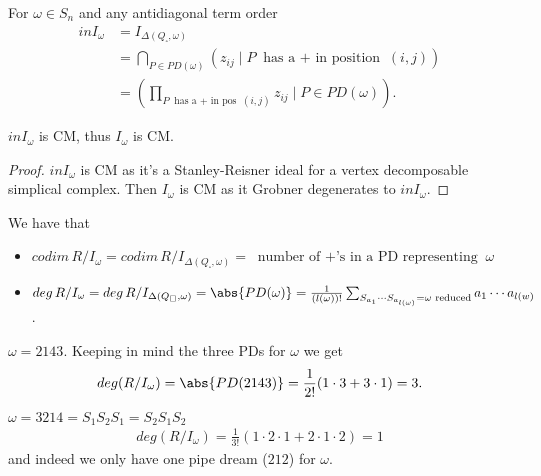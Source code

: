 \begin{theorem}
    For $\omega \in S_n$ and any antidiagonal term order
    \begin{align*}
        in I_\omega &= I_{\Delta (Q_\square, \omega)}\\
        &= \bigcap_{P \in PD(\omega)} ( z_{ij} \mid P \text{ has a $+$ in position } (i,j) )\\
        &= ( \prod_{P \text{ has a $+$ in pos } (i,j)} z_{ij} \mid P \in PD(\omega) ).
    \end{align*}
\end{theorem}

\begin{corollary}
    $in I_\omega $ is CM, thus $I_\omega$ is CM.
\end{corollary}

\begin{proof}
    $in  I_\omega$ is CM as it's a Stanley-Reisner ideal for a vertex decomposable simplical complex. Then $I_\omega$ is CM as it Grobner degenerates to $in I_\omega$.
\end{proof}

\begin{corollary}
    We have that
    \begin{itemize}
        \item $codim\, R/ I_\omega = codim\, R/ I_{\Delta (Q_\square, \omega )} = \text{ number of $+$'s in a PD representing } \omega$
        \item $deg \,R / I_\omega  = deg \, R/ I_{\Delta (Q_\square , \omega) } = \abs{ PD(\omega)} = \frac{1}{(l(\omega ))!} \sum_{S_{a_{1}} \cdots S_{a_{l(\omega)} } = \omega \text{ reduced} } a_1 \cdots a_{l(w)} $.
    \end{itemize}
\end{corollary}

\begin{example}
    $\omega = 2143$. Keeping in mind the three PDs for $\omega$ we get
    \begin{align*}
        deg( R/ I_\omega ) = \abs{ PD(2143) } = \frac{1}{2!} ( 1 \cdot 3 + 3 \cdot 1 ) = 3.
    \end{align*}
\end{example}

\begin{example}
    $\omega = 3214 = S_1 S_2 S_1 = S_2 S_1 S_2$
    \begin{align*}
        deg( R/ I_\omega ) = \frac{1}{3!} (1 \cdot 2 \cdot 1 + 2 \cdot 1 \cdot 2 ) = 1
    \end{align*}
    and indeed we only have one pipe dream ($212$) for $\omega$.
\end{example}

